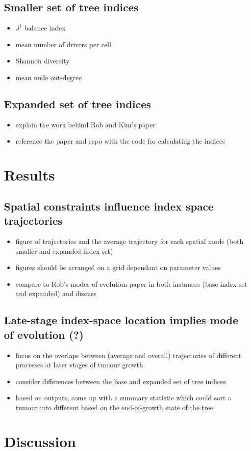 \subsection{Smaller set of tree indices}
\begin{itemize}
    \item $J^1$ balance index
    \item mean number of drivers per cell
    \item Shannon diversity
    \item mean node out-degree
\end{itemize}

\subsection{Expanded set of tree indices}
\begin{itemize}
    \item explain the work behind Rob and Kim's paper
    \item reference the paper and repo with the code for calculating the indices
\end{itemize}

\section{Results}
\subsection{Spatial constraints influence index space trajectories}
\begin{itemize}
    \item figure of trajectories and the average trajectory for each spatial mode (both smaller and expanded index set)
    \item figures should be arranged on a grid dependant on parameter values
    \item compare to Rob's modes of evolution paper in both instances (base index set and expanded) and discuss
\end{itemize}
\subsection{Late-stage index-space location implies mode of evolution (?)}
\begin{itemize}
    \item focus on the overlaps between (average and overall) trajectories of different processes at later stages of tumour growth
    \item consider differences between the base and expanded set of tree indices
    \item based on outputs, come up with a summary statistic which could sort a tumour into different based on the end-of-growth state of the tree
\end{itemize}

\section{Discussion}
